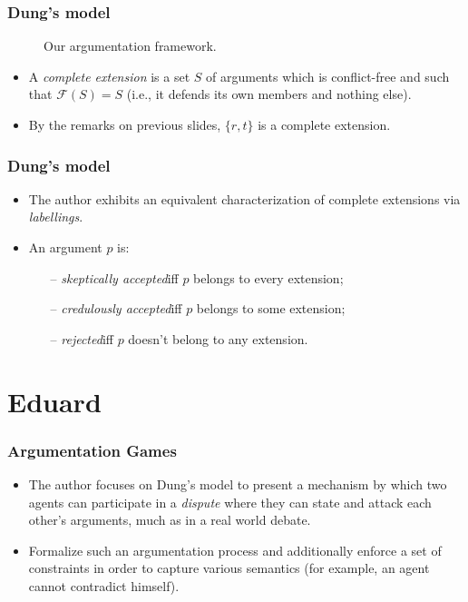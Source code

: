 \documentclass{beamer}
\begin{document}
\begin{frame}
\frametitle{Dung's model}
\begin{figure}
\centering
{}
\caption{Our argumentation framework.} \label{af}
\end{figure}
\begin{itemize}
\item A \emph{complete extension} is a set $S$ of arguments which is conflict-free and such that \( \mathcal{F}(S) = S \) (i.e., it defends its own members and nothing else). \pause
\item By the remarks on previous slides, $\{ r, t \}$ is a complete extension.
\end{itemize}
\end{frame}

\begin{frame}
\frametitle{Dung's model}
\begin{itemize}
\item The author exhibits an equivalent characterization of complete extensions via \emph{labellings}. \pause
\item An argument $p$ is:
  \begin{itemize}
  \item[--] \emph{skeptically accepted}\quad iff $p$ belongs to every extension;
  \item[--] \emph{credulously accepted}\quad iff $p$ belongs to some extension;
  \item[--] \emph{rejected}\quad iff $p$ doesn't belong to any extension.
  \end{itemize}
\end{itemize}
\end{frame}


\section{Eduard}
\begin{frame}
	\frametitle{Argumentation Games}
	\begin{itemize}
		\item The author focuses on Dung's model to present a mechanism by which two agents can participate in a \emph{dispute} where they can state and attack each other's arguments, much as in a real world debate. \pause

		\item Formalize such an argumentation process and additionally enforce a set of constraints in order to capture various semantics (for example, an agent cannot contradict himself).
	\end{itemize}
\end{frame}
\end{document}
